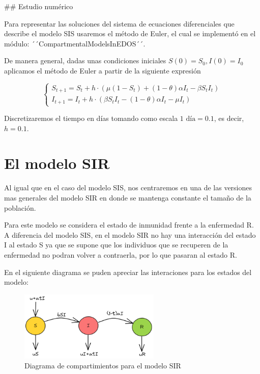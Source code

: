 ## Estudio numérico

Para representar las soluciones del sistema de ecuaciones diferenciales que describe el modelo SIS usaremos el método de Euler, el cual se implementó en el módulo: ´´CompartmentalModelsInEDOS´´.

De manera general, dadas unas condiciones iniciales $S(0)=S_0,I(0)=I_0$ aplicamos el método de Euler a partir de la siguiente expresión

$$\left\{\begin{array}{l}
S_{t+1} = S_t + h\cdot(\mu(1 - S_t) + (1 - \theta)\alpha I_t - \beta S_t I_t ) \\
I_{t+1} = I_t + h\cdot(\beta S_t I_t - (1 - \theta)\alpha I_t - \mu I_t)
\end{array}\right.$$

Discretizaremos el tiempo en días tomando como escala $1\text{ día}=0.1$, es decir, $h=0.1$.

\section{El modelo SIR}

Al igual que en el caso del modelo SIS, nos centraremos en una de las versiones mas generales del modelo SIR en donde se mantenga constante el tamaño de la población.

Para este modelo se considera el estado de inmunidad frente a la enfermedad R. A diferencia del modelo SIS, en el modelo SIR no hay una interacción del estado I al estado S ya que se supone que los individuos que se recuperen de la enfermedad no podran volver a contraerla, por lo que pasaran al estado R. 

En el siguiente diagrama se puden apreciar las interaciones para los estados del modelo:

\begin{figure}[h]
  \centering
    \includegraphics[width=0.6\textwidth]{Imagenes/SIR_compartimientos.PNG}
  \caption{Diagrama de compartimientos para el modelo SIR}
  \label{fig:ClasicSIR}
\end{figure}

